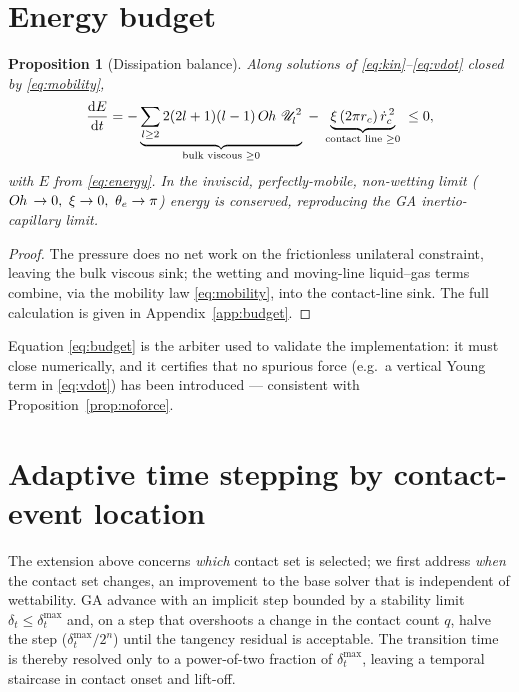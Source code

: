 \documentclass{jfm}
\newcommand{\be}{\begin{equation}}
\newcommand{\ee}{\end{equation}}
\newcommand{\Oh}{O\kern-0.05em h\,}
\newtheorem{proposition}{Proposition}
\begin{document}
\section{Energy budget}\label{sec:budget}

\begin{proposition}[Dissipation balance]\label{prop:budget}
Along solutions of \eqref{eq:kin}--\eqref{eq:vdot} closed by \eqref{eq:mobility},
\be\label{eq:budget}
\frac{\mathrm dE}{\mathrm dt}
=-\underbrace{\sum_{l\ge2}2(2l+1)(l-1)\,\Oh\,\mathscr U_l^2}_{\text{bulk viscous }\ge0}
 \;-\;\underbrace{\xi\,(2\pi r_c)\,\dot r_c^{\,2}}_{\text{contact line }\ge0}\;\le0,
\ee
with $E$ from \eqref{eq:energy}. In the inviscid, perfectly-mobile, non-wetting limit
($\Oh\to0,\ \xi\to0,\ \theta_e\to\pi$) energy is conserved, reproducing the GA
inertio-capillary limit.
\end{proposition}
\begin{proof}
The pressure does no net work on the frictionless unilateral constraint, leaving the
bulk viscous sink; the wetting and moving-line liquid--gas terms combine, via the
mobility law \eqref{eq:mobility}, into the contact-line sink. The full calculation is
given in Appendix~\ref{app:budget}.
\end{proof}

Equation \eqref{eq:budget} is the arbiter used to validate the implementation: it must
close numerically, and it certifies that no spurious force (e.g.\ a vertical Young term
in \eqref{eq:vdot}) has been introduced --- consistent with
Proposition~\ref{prop:noforce}.

\section{Adaptive time stepping by contact-event location}\label{sec:events}

The extension above concerns \emph{which} contact set is selected; we first address
\emph{when} the contact set changes, an improvement to the base solver that is
independent of wettability. GA advance with an implicit step bounded by a stability
limit $\delta_t\le\delta_t^{\max}$ and, on a step that overshoots a change in the contact
count $q$, halve the step ($\delta_t^{\max}/2^n$) until the tangency residual is
acceptable. The transition time is thereby resolved only to a power-of-two fraction of
$\delta_t^{\max}$, leaving a temporal staircase in contact onset and lift-off.
\end{document}
